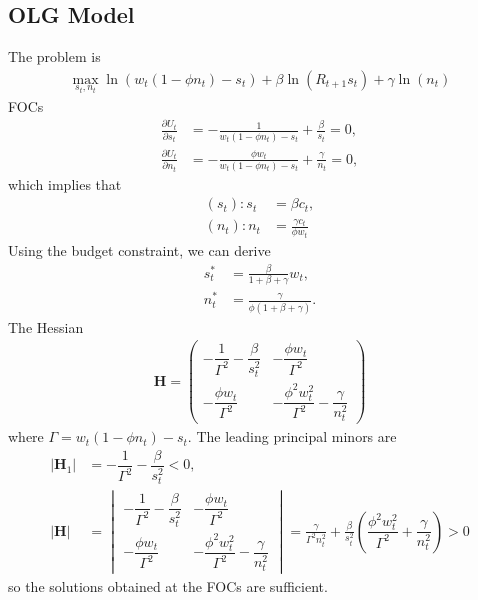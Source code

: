 \documentclass[11pt,a4paper]{book}
\theoremstyle{definition}\newtheorem{definition}{Definition}
\theoremstyle{definition}\newtheorem{fact}{Fact}
\theoremstyle{definition}\newtheorem{remark}{Remark}
\theoremstyle{definition}\newtheorem{ex}{Ex.}
\theoremstyle{definition}\newtheorem{project}{Project}
\theoremstyle{definition}\newtheorem{problem}{Problem}
\theoremstyle{definition}\newtheorem{example}{Example}
\numberwithin{theorem}{section}
\numberwithin{corollary}{chapter}
\numberwithin{assumption}{chapter}
\numberwithin{definition}{chapter}
\numberwithin{prop}{chapter}
\numberwithin{notation}{chapter}
\numberwithin{problem}{chapter}
\numberwithin{example}{chapter}
\numberwithin{fact}{chapter}
\numberwithin{ex}{chapter}
\def\H{\mathbf H}
\begin{document}
\begin{appendices}
	\section{OLG Model} \label{appendix:olg}
	The problem is
	\begin{align*}
		\max_{s_t, n_t} \ln( w_t(1-\phi n_t) - s_t) + \beta \ln(R_{t+1} s_t) + \gamma \ln(n_t)
	\end{align*}
	FOCs
	\begin{align*}
		\frac{\partial U_t}{\partial s_t} &= -\frac{1}{w_t(1-\phi n_t) - s_t} + \frac{\beta}{s_t} = 0, \\
		\frac{\partial U_t}{\partial n_t} &= -\frac{\phi w_t}{w_t(1-\phi n_t) - s_t} + \frac{\gamma}{n_t} = 0,
	\end{align*}
	which implies that
	\begin{align*}
		(s_t):  s_t &= \beta c_t, \\
		(n_t):  n_t &= \frac{\gamma c_t}{\phi w_t}  
	\end{align*}
	Using the budget constraint, we can derive
	\begin{align*}
		s^*_t &= \frac{\beta}{1+\beta+\gamma} w_t, \\
		n^*_t &= \frac{\gamma}{\phi(1+\beta+\gamma)}.
	\end{align*}
	The Hessian
	\begin{align*}
		\H = \begin{pmatrix}
			-\dfrac{1}{\Gamma^2} - \dfrac{\beta}{s_t^2} & -\dfrac{\phi w_t}{\Gamma^2} \\
			-\dfrac{\phi w_t}{\Gamma^2} & -\dfrac{\phi^2 w_t^2}{\Gamma^2} - \dfrac{\gamma}{n_t^2}
		\end{pmatrix}
	\end{align*}
	where $ \Gamma = w_t(1-\phi n_t) - s_t$. The leading principal minors are
	\begin{align*}
		|\H_1| &= -\dfrac{1}{\Gamma^2} - \dfrac{\beta}{s_t^2} < 0, \\
		|\H | &= \begin{vmatrix}
			-\dfrac{1}{\Gamma^2} - \dfrac{\beta}{s_t^2} & -\dfrac{\phi w_t}{\Gamma^2} \\
			-\dfrac{\phi w_t}{\Gamma^2} & -\dfrac{\phi^2 w_t^2}{\Gamma^2} - \dfrac{\gamma}{n_t^2}
		\end{vmatrix} = \frac{\gamma}{\Gamma^2 n_t^2} + \frac{\beta}{s_t^2}\left(\dfrac{\phi^2 w_t^2}{\Gamma^2} + \dfrac{\gamma}{n_t^2}\right) > 0
	\end{align*}
	so the solutions obtained at the FOCs are sufficient.
	

\end{appendices}
\end{document}
